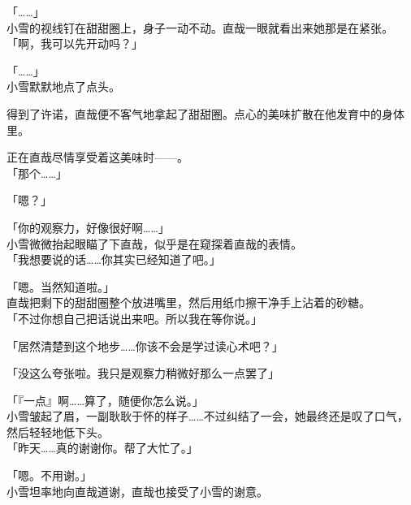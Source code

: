 「……」\\

小雪的视线钉在甜甜圈上，身子一动不动。直哉一眼就看出来她那是在紧张。\\

「啊，我可以先开动吗？」

「……」\\

小雪默默地点了点头。

得到了许诺，直哉便不客气地拿起了甜甜圈。点心的美味扩散在他发育中的身体里。

正在直哉尽情享受着这美味时——。\\

「那个……」

「嗯？」

「你的观察力，好像很好啊……」\\

小雪微微抬起眼瞄了下直哉，似乎是在窥探着直哉的表情。\\

「我想要说的话……你其实已经知道了吧。」

「嗯。当然知道啦。」\\

直哉把剩下的甜甜圈整个放进嘴里，然后用纸巾擦干净手上沾着的砂糖。\\

「不过你想自己把话说出来吧。所以我在等你说。」

「居然清楚到这个地步……你该不会是学过读心术吧？」

「没这么夸张啦。我只是观察力稍微好那么一点罢了」

「『一点』啊……算了，随便你怎么说。」\\

小雪皱起了眉，一副耿耿于怀的样子……不过纠结了一会，她最终还是叹了口气，然后轻轻地低下头。\\

「昨天……真的谢谢你。帮了大忙了。」

「嗯。不用谢。」\\

小雪坦率地向直哉道谢，直哉也接受了小雪的谢意。
